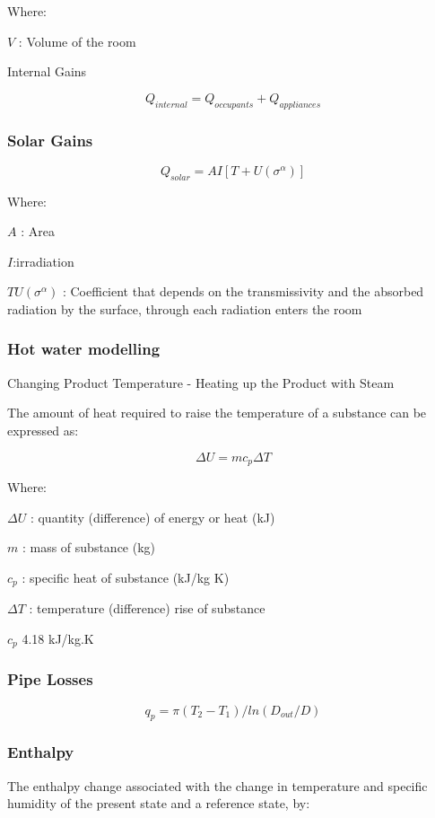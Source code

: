 \documentclass[]{book}
\theoremstyle{definition}
\theoremstyle{definition}
\theoremstyle{definition}
\theoremstyle{remark}
\begin{document}
Where:

\(V\) : Volume of the room

Internal Gains

\[Q_{internal} = Q_{occupants}  + Q_{appliances}\]

\subsubsection{Solar Gains}\label{solar-gains}

\[Q_{solar}  = AI [T+U(\sigma^\alpha)]\]

Where:

\(A\) : Area

\(I\):irradiation

\(TU(\sigma^\alpha)\) : Coefficient that depends on the transmissivity
and the absorbed radiation by the surface, through each radiation enters
the room

\subsubsection{Hot water modelling}\label{hot-water-modelling}

Changing Product Temperature - Heating up the Product with Steam

The amount of heat required to raise the temperature of a substance can
be expressed as:

\[\Delta U = m c_{p} \Delta T\]

Where:

\(\Delta U\) : quantity (difference) of energy or heat (kJ)

\(m\) : mass of substance (kg)

\(c_{p}\) : specific heat of substance (kJ/kg K)

\(\Delta T\) : temperature (difference) rise of substance

\(c_{p}\) 4.18 kJ/kg.K

\subsubsection{Pipe Losses}\label{pipe-losses}

\[q_{p}= \pi  (T_{2}-T_{1})/ ln (D_{out}/D)\]

\subsubsection{Enthalpy}\label{enthalpy}

The enthalpy change associated with the change in temperature and
specific humidity of the present state and a reference state, by:
\end{document}
